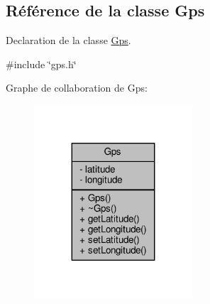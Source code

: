\hypertarget{class_gps}{}\subsection{Référence de la classe Gps}
\label{class_gps}


Declaration de la classe \hyperlink{class_gps}{Gps}.  




{\ttfamily \#include \char`\"{}gps.\+h\char`\"{}}



Graphe de collaboration de Gps\+:
\nopagebreak
\begin{figure}[H]
\begin{center}
\leavevmode
\includegraphics[width=167pt]{class_gps__coll__graph}
\end{center}
\end{figure}
